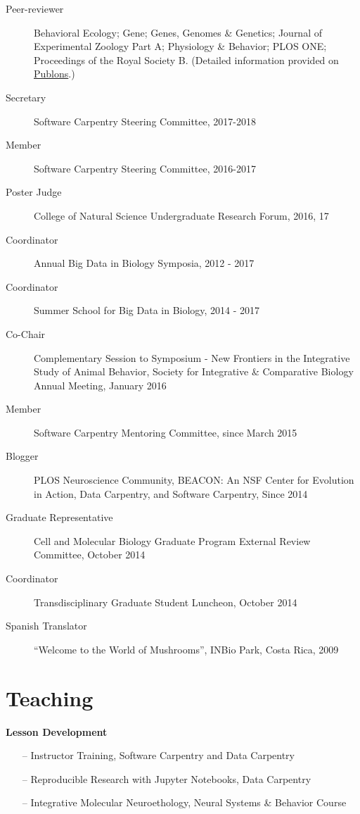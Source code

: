 \documentclass[margin,line]{resume}
\begin{document}
\begin{resume}
\begin{description}
\item[Peer-reviewer] Behavioral Ecology; Gene; Genes, Genomes \& Genetics; Journal of Experimental Zoology Part A; Physiology \& Behavior; PLOS ONE; Proceedings of the Royal Society B. (Detailed information provided on \href{https://publons.com/author/444397/rayna-harris#profile)}{Publons}.) 
\item[Secretary] Software Carpentry Steering Committee, 2017-2018
\item[Member] Software Carpentry Steering Committee, 2016-2017
\item[Poster Judge] College of Natural Science Undergraduate Research Forum, 2016, 17
\item[Coordinator] Annual Big Data in Biology Symposia, 2012 - 2017 
\item[Coordinator] Summer School for Big Data in Biology, 2014 - 2017
\item[Co-Chair] Complementary Session to Symposium - New Frontiers in the Integrative Study of Animal Behavior, Society for Integrative \& Comparative Biology Annual Meeting, January 2016
\item[Member] Software Carpentry Mentoring Committee, since March 2015
\item[Blogger] PLOS Neuroscience Community, BEACON: An NSF Center for Evolution in Action, Data Carpentry, and Software Carpentry, Since 2014
\item[Graduate Representative] Cell and Molecular Biology Graduate Program External Review Committee, October 2014 
\item[Coordinator] Transdisciplinary Graduate Student Luncheon, October 2014
\item[Spanish Translator] “Welcome to the World of Mushrooms”, INBio Park, Costa Rica, 2009
\end{description}

    
\section{\mysidestyle Teaching}
{\bf Lesson Development}
\begin{itemize}
\raggedright
\item[--] Instructor Training, Software Carpentry and Data Carpentry
\item[--] Reproducible Research with Jupyter Notebooks, Data Carpentry
\item[--] Integrative Molecular Neuroethology, Neural Systems \& Behavior Course 


\end{itemize}
\end{resume}
\end{document}
